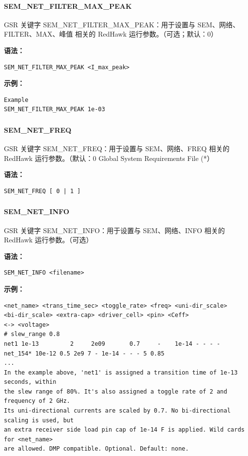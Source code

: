 \paragraph*{SEM_NET_FILTER_MAX_PEAK}

GSR 关键字 SEM_NET_FILTER_MAX_PEAK：用于设置与 SEM、网络、FILTER、MAX、峰值 相关的 RedHawk 运行参数。（可选；默认：0）

\textbf{语法：}
\begin{lstlisting}
SEM_NET_FILTER_MAX_PEAK <I_max_peak>
\end{lstlisting}

\textbf{示例：}
\begin{lstlisting}
Example
SEM_NET_FILTER_MAX_PEAK 1e-03
\end{lstlisting}

\subsubsection{}
\paragraph*{SEM_NET_FREQ}

GSR 关键字 SEM_NET_FREQ：用于设置与 SEM、网络、FREQ 相关的 RedHawk 运行参数。（默认：0 Global System Requirements File (*）

\textbf{语法：}
\begin{lstlisting}
SEM_NET_FREQ [ 0 | 1 ]
\end{lstlisting}

\subsubsection{}
\paragraph*{SEM_NET_INFO}

GSR 关键字 SEM_NET_INFO：用于设置与 SEM、网络、INFO 相关的 RedHawk 运行参数。（可选）

\textbf{语法：}
\begin{lstlisting}
SEM_NET_INFO <filename>
\end{lstlisting}

\textbf{示例：}
\begin{lstlisting}
<net_name> <trans_time_sec> <toggle_rate> <freq> <uni-dir_scale>
<bi-dir_scale> <extra-cap> <driver_cell> <pin> <Ceff>
<-> <voltage>
# slew_range 0.8
net1 1e-13         2     2e09       0.7     -    1e-14 - - - -
net_154* 10e-12 0.5 2e9 7 - 1e-14 - - - 5 0.85
...
In the example above, 'net1' is assigned a transition time of 1e-13 seconds, within
the slew range of 80%. It's also assigned a toggle rate of 2 and frequency of 2 GHz.
Its uni-directional currents are scaled by 0.7. No bi-directional scaling is used, but
an extra receiver side load pin cap of 1e-14 F is applied. Wild cards for <net_name>
are allowed. DMP compatible. Optional. Default: none.
\end{lstlisting}

